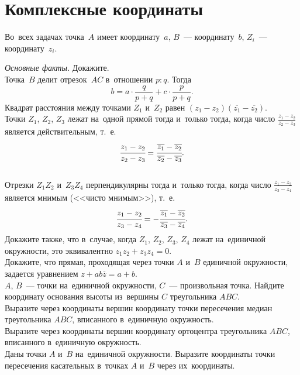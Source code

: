 
\section*{Комплексные координаты}


\begingroup
    \def\ov{\overline}

Во~всех задачах точка~$A$ имеет координату~$a$, $B$~--- координату~$b$,
$Z_i$~--- координату~$z_i$.

\begin{problems}

\item\emph{Основные факты.}
Докажите.
\\
\sp
Точка~$B$ делит отрезок~$AC$ в~отношении $p : q$.
Тогда
\[
    b
=
    a \cdot \frac{q}{p + q} + c \cdot \frac{p}{p + q}
.\]
\sp
Квадрат расстояния между точками $Z_1$ и~$Z_2$ равен
\(
    (z_1 - z_2) (\ov{z_1} - \ov{z_2})
\).
\\[0.3ex]
\sp
Точки $Z_1$, $Z_2$, $Z_3$ лежат на~одной прямой
тогда и~только тогда, когда
число $\frac{z_1 - z_2}{z_2 - z_3}$ является действительным, т.~е.
\[
    \cfrac{z_1 - z_2}{z_2 - z_3}
=
    \cfrac{\ov{z_1} - \ov{z_2}}{\ov{z_2} - \ov{z_3}}
.\]
\\
\sp
Отрезки $Z_1 Z_2$ и~$Z_3 Z_4$ перпендикулярны
тогда и~только тогда, когда
число $\frac{z_1 - z_2}{z_3 - z_4}$ является мнимым (<<чисто мнимым>>), т.~е.
\[
    \cfrac{z_1 - z_2}{z_3 - z_4}
=
    -\cfrac{\ov{z_1} - \ov{z_2}}{\ov{z_3} - \ov{z_4}}
.\]
Докажите также, что в~случае, когда $Z_1$, $Z_2$, $Z_3$, $Z_4$ лежат
на~единичной окружности, это эквивалентно $z_1 z_2 + z_3 z_4 = 0$.
\\
\sp
Докажите, что прямая, проходящая через точки $A$ и~$B$ единичной окружности,
задается уравнением $z + a b \ov{z} = a + b$.
\\
\sp
$A$, $B$~--- точки на~единичной окружности, $C$~--- произвольная точка.
Найдите координату основания высоты из~вершины $C$ треугольника $ABC$.
\\
\sp
Выразите через координаты вершин координату точки пересечения медиан
треугольника $ABC$, вписанного в~единичную окружность.
\\
\sp
Выразите через координаты вершин координату ортоцентра треугольника $ABC$,
вписанного в~единичную окружность.
\\
\sp
Даны точки $A$ и~$B$ на~единичной окружности.
Выразите координаты точки пересечения касательных в~точках $A$ и~$B$ через
их~координаты.


\end{problems}
